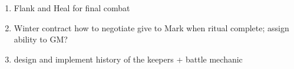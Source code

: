 \documentclass[green]{gl2018}
\begin{document}
\name{\gGMToDo{}}

\begin{enumerate}
\item Flank and Heal for final combat
\item Winter contract how to negotiate give to Mark when ritual complete; assign ability to GM?
\item design and implement history of the keepers + battle mechanic
\end{enumerate}
\end{document}
